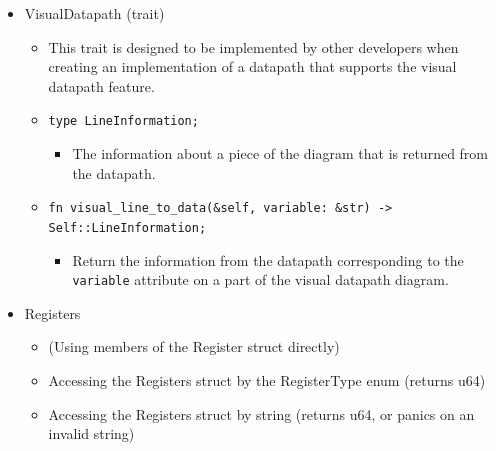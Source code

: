 \documentclass[
    paper=letter,
    parskip=half,
    fontsize=12pt,
    titlepage=firstiscover,
    toc=bibliography,
    numbers=endperiod
]{scrartcl}
\providecommand{\tightlist}{%
  \setlength{\itemsep}{0pt}\setlength{\parskip}{0pt}}
\begin{document}
\begin{itemize}
    \item VisualDatapath (trait)
          \begin{itemize}
              \tightlist
              \item This trait is designed to be implemented by other developers when creating an implementation of a datapath that supports the visual datapath feature.
              \item \texttt{type LineInformation;}
                    \begin{itemize}
                        \tightlist
                        \item The information about a piece of the diagram that is returned from the datapath.
                    \end{itemize}
             \item \texttt{fn visual\_line\_to\_data(\&self, variable: \&str) -\textgreater{} Self::LineInformation;}
                   \begin{itemize}
                        \tightlist
                        \item Return the information from the datapath corresponding to the \texttt{variable} attribute on a part of the visual datapath diagram.
                   \end{itemize}
          \end{itemize}

    \item Registers
          \begin{itemize}
              \tightlist
              \item (Using members of the Register struct directly)
              \item Accessing the Registers struct by the RegisterType enum (returns u64)
              \item Accessing the Registers struct by string (returns u64, or panics on an
                    invalid string)
          \end{itemize}


\end{itemize}
\end{document}
